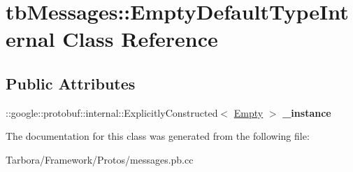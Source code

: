 \hypertarget{classtbMessages_1_1EmptyDefaultTypeInternal}{}\section{tb\+Messages\+:\+:Empty\+Default\+Type\+Internal Class Reference}
\label{classtbMessages_1_1EmptyDefaultTypeInternal}
\subsection*{Public Attributes}
\begin{DoxyCompactItemize}
\item 
\mbox{\label{classtbMessages_1_1EmptyDefaultTypeInternal_ab86b0f872d49ea95442d6919ad65465a}} 
\+::google\+::protobuf\+::internal\+::\+Explicitly\+Constructed$<$ \hyperlink{classtbMessages_1_1Empty}{Empty} $>$ {\bfseries \+\_\+instance}
\end{DoxyCompactItemize}


The documentation for this class was generated from the following file\+:\begin{DoxyCompactItemize}
\item 
Tarbora/\+Framework/\+Protos/messages.\+pb.\+cc\end{DoxyCompactItemize}
